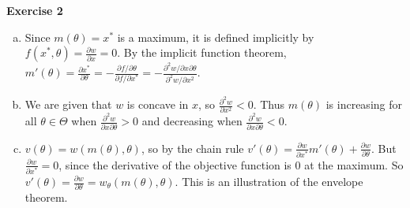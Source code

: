 \documentclass{article}
\newcommand{\heading}[1]{\bigskip \textbf{#1}}
\begin{document}
\heading{Exercise 2}

\begin{enumerate}[(a)]

	\item

	Since $m(\theta) = x^*$ is a maximum, it is defined implicitly by $f(x^*, \theta) = \frac{\partial w}{\partial x} = 0$. By the implicit function theorem, $m'(\theta) = \frac{ \partial x^*} {\partial \theta} = -\frac{\partial f / \partial \theta} {\partial f / \partial x^*} = - \frac{ \partial^2 w / \partial x \partial \theta} { \partial^2 w / \partial x^2}$.

	\item

	We are given that $w$ is concave in $x$, so $\frac{\partial^2 w}{\partial x^2 } < 0$. Thus $m(\theta)$ is increasing for all $\theta \in \Theta$ when $\frac{\partial^2 w}{\partial x \partial \theta } > 0$ and decreasing when $\frac{\partial^2 w}{\partial x \partial \theta } < 0$.

	\item

	$v(\theta) = w(m(\theta), \theta)$, so by the chain rule $v'(\theta) = \frac{\partial w} {\partial x^*} m'(\theta) + \frac{\partial w} {\partial \theta}$. But $\frac{\partial w}{\partial x^*} = 0$, since the derivative of the objective function is 0 at the maximum. So $v'(\theta) = \frac{\partial w} {\partial \theta} = w_\theta(m(\theta), \theta)$. This is an illustration of the envelope theorem.

\end{enumerate}
\end{document}
